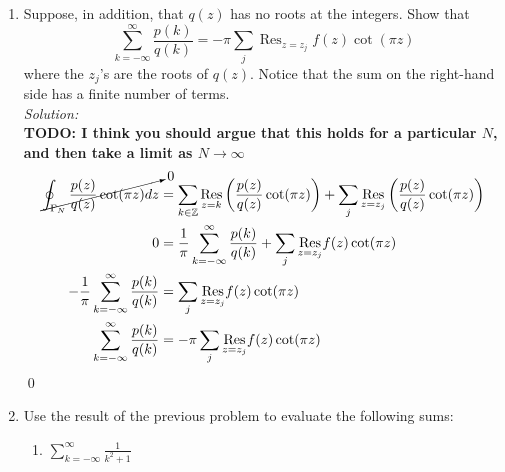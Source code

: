 \documentclass[10pt]{amsart}
\theoremstyle{nonumberplain}
\begin{document}
\begin{enumerate}[label={\bf {\arabic*}:}]
\begin{enumerate}
\item Suppose, in addition, that $q(z)$ has no roots at the integers. Show that
$$
\sum_{k=-\infty}^{\infty} \frac{p(k)}{q(k)} = -\pi \sum_j \operatorname{Res}_{z=z_j} f(z) \cot (\pi z)
$$
where the $z_j$'s are the roots of $q(z)$. Notice that the sum on the
right-hand side has a finite number of terms. \\
 
\noindent
\textit{Solution:} \\
\textbf{TODO: I think you should argue that this holds for a particular $N$, and then take a limit as $N \rightarrow \infty$}
\begin{align*}
\cancelto{0}{\oint_{\Gamma_N} \frac{p(z)}{q(z)} \cot (\pi z) d z}
	&= \sum_{k \in \mathbb Z} \underset{z=k}{ \rm Res} \left( \frac{p(z)}{q(z)} \cot (\pi z) \right)
		+ \sum_j \underset{z=z_j}{ \rm Res} \left( \frac{p(z)}{q(z)} \cot (\pi z) \right) \\
0 &= \frac 1 \pi \sum_{k=-\infty}^{\infty} \frac{p(k)}{q(k)}
		+ \sum_j \underset{z=z_j}{ \rm Res} f(z) \cot (\pi z) \\
- \frac 1 \pi \sum_{k=-\infty}^{\infty} \frac{p(k)}{q(k)}
	&= \sum_j \underset{z=z_j}{ \rm Res} f(z) \cot (\pi z) \\
\sum_{k=-\infty}^{\infty} \frac{p(k)}{q(k)}
	&= - \pi \sum_j \underset{z=z_j}{ \rm Res} f(z) \cot (\pi z)
\end{align*}
\qed

\newpage

\item Use the result of the previous problem to evaluate the following sums:
\begin{enumerate}
\item  $\displaystyle \sum_{k=-\infty}^{\infty} \frac{1}{k^2+1}$ \\
 

\end{enumerate}
\end{enumerate}
\end{enumerate}
\end{document}

